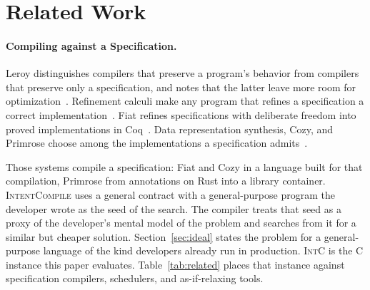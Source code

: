 \section{Related Work}
\label{sec:related}

\paragraph{Compiling against a Specification.}
Leroy distinguishes compilers that preserve a program's behavior from
compilers that preserve only a specification, and notes that the latter
leave more room for optimization~\cite[\S2.1]{leroy2009backend}. Refinement
calculi make any program that refines a specification a correct
implementation~\cite{back1998refinement,morgan1994programming}. Fiat
refines specifications with deliberate freedom into proved implementations
in Coq~\cite{delaware2015fiat}. Data representation synthesis, Cozy, and
Primrose choose among the implementations a specification
admits~\cite{hawkins2011representation,loncaric2016cozy,Qin2023Primrose}.

Those systems compile a specification: Fiat and Cozy in a language built
for that compilation, Primrose from annotations on Rust into a library
container. \textsc{IntentCompile} uses a general contract with a
general-purpose program the developer wrote as the seed of the search.
The compiler treats that seed as a proxy of the developer's mental model of
the problem and searches from it for a similar but cheaper solution.
Section~\ref{sec:ideal} states the problem for a general-purpose language
of the kind developers already run in production. \textsc{IntC} is the C
instance this paper evaluates. Table~\ref{tab:related} places that instance
against specification compilers, schedulers, and as-if-relaxing tools.

